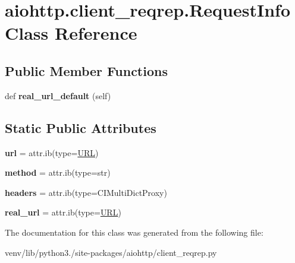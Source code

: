 \hypertarget{classaiohttp_1_1client__reqrep_1_1_request_info}{}\section{aiohttp.\+client\+\_\+reqrep.\+Request\+Info Class Reference}
\label{classaiohttp_1_1client__reqrep_1_1_request_info}
\subsection*{Public Member Functions}
\begin{DoxyCompactItemize}
\item 
\mbox{\label{classaiohttp_1_1client__reqrep_1_1_request_info_a3076e2540cdd1e3d851d049cdfd3f949}} 
def {\bfseries real\+\_\+url\+\_\+default} (self)
\end{DoxyCompactItemize}
\subsection*{Static Public Attributes}
\begin{DoxyCompactItemize}
\item 
\mbox{\label{classaiohttp_1_1client__reqrep_1_1_request_info_aa00e0826955e322512e37b5d0e5dd03e}} 
{\bfseries url} = attr.\+ib(type=\hyperlink{classyarl_1_1_u_r_l}{U\+RL})
\item 
\mbox{\label{classaiohttp_1_1client__reqrep_1_1_request_info_aaf2dc725f46e38a2079442ed92473dcd}} 
{\bfseries method} = attr.\+ib(type=str)
\item 
\mbox{\label{classaiohttp_1_1client__reqrep_1_1_request_info_a01a81641cb01d83db435e88b4cf80781}} 
{\bfseries headers} = attr.\+ib(type=C\+I\+Multi\+Dict\+Proxy)
\item 
\mbox{\label{classaiohttp_1_1client__reqrep_1_1_request_info_ab0374f19be1154a84a8c55957ecbada9}} 
{\bfseries real\+\_\+url} = attr.\+ib(type=\hyperlink{classyarl_1_1_u_r_l}{U\+RL})
\end{DoxyCompactItemize}


The documentation for this class was generated from the following file\+:\begin{DoxyCompactItemize}
\item 
venv/lib/python3./site-\/packages/aiohttp/client\+\_\+reqrep.\+py\end{DoxyCompactItemize}
